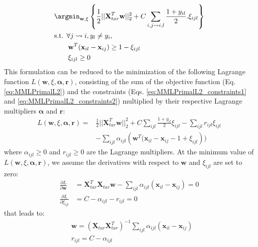 \begin{align}
	&\displaystyle 		\argmin_{\textbf{w},\xi}
	\left\lbrace \frac{1}{2}||\textbf{X}_{tar}^T \textbf{w}||_2^2						
	+					
	C\sum\limits_{i,j \rightsquigarrow i,l} \frac{1+y_{il}}{2}.\xi_{ijl}
	\right\rbrace  \label{eq:MMLPrimalL2} \\
	&\text{s.t.  } \forall j \rightsquigarrow i, y_l\neq y_i, \nonumber \\
	& \qquad \textbf{w}^T(\textbf{x}_{il}-\textbf{x}_{ij}) \geq 1-\xi_{ijl} \label{eq:MMLPrimalL2_constraints1} \\
	& \qquad \xi_{ijl} \geq 0 \label{eq:MMLPrimalL2_constraints2}
\end{align}
This formulation can be reduced to the minimization of the following Lagrange function $L(\textbf{w},\xi,\boldsymbol{\alpha},\textbf{r})$, consisting of the sum of the objective function (Eq. \ref{eq:MMLPrimalL2}) and the constraints (Eqs. \ref{eq:MMLPrimalL2_constraints1} and \ref{eq:MMLPrimalL2_constraints2}) multiplied by their respective Lagrange multipliers $\boldsymbol{\alpha}$ and $\textbf{r}$:
\begin{equation}
\begin{aligned}
L(\textbf{w},\xi,\boldsymbol{\alpha},\textbf{r}) 
= & 
\frac{1}{2}||\textbf{X}_{tar}^T \textbf{w}||_2^2
+ C \sum\limits_{ijl} \frac{1+y_{il}}{2} \xi_{ijl} - \sum\limits_{ijl}r_{ijl} \xi_{ijl} \\
&  - \sum\limits_{ijl} \alpha_{ijl}\left( \textbf{w}^T(\textbf{x}_{il}-\textbf{x}_{ij}-1+\xi_{ijl} \right))
\label{eq:OptimizationDual}
\end{aligned}
\end{equation}
\noindent where $\alpha_{ijl} \geq 0$ and $r_{ijl} \geq 0$ are the Lagrange multipliers. At the minimum value of $L(\textbf{w},\xi,\boldsymbol{\alpha},\textbf{r})$, we assume the derivatives with respect to $\textbf{w}$ and $\xi_{ijl}$ are set to zero:
\begin{align*}
	\frac{\partial L}{\partial \textbf{w}} 
	& = 
	\textbf{X}_{tar}^T \textbf{X}_{tar} \textbf{w} 
	- \sum\limits_{ijl} \alpha_{ijl}(\textbf{x}_{il}-\textbf{x}_{ij}) 
	= 0 \\
	\frac{\partial L}{\partial \xi_{ijl}} & = C - \alpha_{ijl} - r_{ijl} = 0
\end{align*}
\noindent that leads to:
\begin{align}
	& \textbf{w} = (\textbf{X}_{tar} \textbf{X}_{tar}^T)^{-1}  
	\sum\limits_{ijl} \alpha_{ijl}(\textbf{x}_{il}-\textbf{x}_{ij}) \label{Eq:eqn_w} 
	\\ 
	& r_{ijl} = C - \alpha_{ijl} \label{Eq:eqn_w2}
\end{align}

